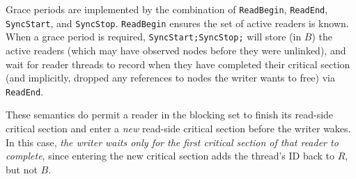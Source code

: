 Grace periods are implemented by the combination of \lstinline|ReadBegin|, \lstinline|ReadEnd|, \lstinline|SyncStart|, and \lstinline|SyncStop|.
\lstinline|ReadBegin| ensures the set of active readers is known.  When a grace period is required, \lstinline|SyncStart;SyncStop;| will store (in $B$) the active readers (which may have observed nodes before they were unlinked), and wait for reader threads to record when they have completed their critical section (and implicitly, dropped any references to nodes the writer wants to free) via \lstinline|ReadEnd|.

These semantics do permit a reader in the blocking set to finish its read-side critical section and enter a \emph{new} read-side critical section before the writer wakes.  In this case, \emph{the writer waits only for the first critical section of that reader to complete}, since entering the new critical section adds the thread's ID back to $R$, but not $B$.

